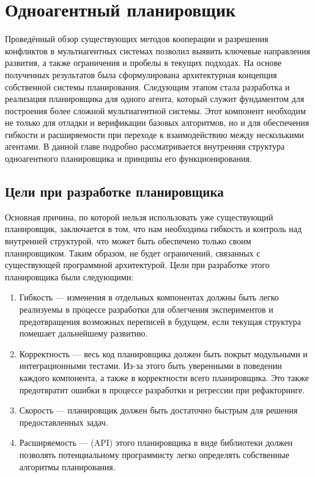 \chapter{Одноагентный планировщик}

Проведённый обзор существующих методов кооперации и разрешения конфликтов
в мультиагентных системах позволил выявить ключевые направления развития,
а также ограничения и пробелы в текущих подходах.
На основе полученных результатов была сформулирована архитектурная
концепция собственной системы планирования.
Следующим этапом стала разработка и реализация планировщика для одного агента,
который служит фундаментом для построения более сложной мультиагентной системы.
Этот компонент необходим не только для отладки и верификации базовых алгоритмов,
но и для обеспечения гибкости и расширяемости
при переходе к взаимодействию между несколькими агентами.
В данной главе подробно рассматривается внутренняя
структура одноагентного планировщика и принципы его функционирования\footnotemark{}.


\section{Цели при разработке планировщика}

Основная причина, по которой нельзя использовать уже существующий планировщик,
заключается в том, что нам необходима гибкость и контроль над внутренней структурой,
что может быть обеспечено только своим планировщиком. Таким образом,
не будет ограничений, связанных с существующей программной архитектурой.
Цели при разработке этого планировщика были следующими:

\begin{enumerate}
  \item Гибкость --- изменения в отдельных компонентах
    должны быть легко реализуемы в процессе разработки для облегчения
    экспериментов и предотвращения возможных переписей в будущем, если текущая
    структура помешает дальнейшему развитию.
  \item Корректность --- весь код планировщика должен быть покрыт
    модульными и интеграционными тестами.
    Из-за этого быть уверенными в поведении каждого компонента,
    а также в корректности всего планировщика.
    Это также предотвратит ошибки в процессе разработки и регрессии при рефакторинге.
  \item Скорость --- планировщик должен быть достаточно быстрым для решения предоставленных задач.
  \item Расширяемость ---  (API)
    этого планировщика в виде библиотеки должен позволять потенциальному программисту
    легко определять собственные алгоритмы планирования.
\end{enumerate}

